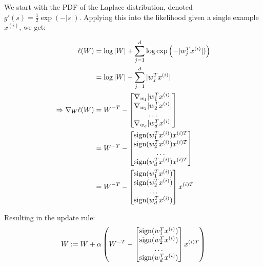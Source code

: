 \begin{answer}
\def\xsi{x^{(i)}}
We start with the PDF of the Laplace distribution, denoted  $g'(s) = \frac{1}{2}\exp(-|s|)$. Applying this into the likelihood given a single example $\xsi$, we get:

\begin{align*}
    \ell(W) &= \log|W| + \sum_{j=1}^\di \log \exp\left(-|w_j^T\xsi|)\right) \\
    &= \log|W| -\sum_{j=1}^\di |w_j^T\xsi| \\
    \Rightarrow \nabla_W\ell(W) &= W^{-T} - \begin{bmatrix} \nabla_{w_1}|w_1^T\xsi| \\ \nabla_{w_2}|w_2^T\xsi| \\
    \ldots \\
    \nabla_{w_{\di}}|w_{\di}^T\xsi|
    \end{bmatrix} \\
    &=  W^{-T} - \begin{bmatrix} \text{sign}(w_1^T\xsi)x^{(i)T} \\
    \text{sign}(w_2^T\xsi)x^{(i)T} \\
    \ldots\\
    \text{sign}(w_{\di}^T\xsi)x^{(i)T}
    \end{bmatrix} \\
    &= W^{-T} - \begin{bmatrix} \text{sign}(w_1^T\xsi) \\
    \text{sign}(w_2^T\xsi) \\
    \ldots\\
    \text{sign}(w_{\di}^T\xsi)
    \end{bmatrix}x^{(i)T}
\end{align*}

Resulting in the update rule:
\begin{align*}
    W := W + \alpha \left(W^{-T} - \begin{bmatrix} \text{sign}(w_1^T\xsi) \\
    \text{sign}(w_2^T\xsi) \\
    \ldots\\
    \text{sign}(w_{\di}^T\xsi)
    \end{bmatrix}x^{(i)T} \right)
\end{align*}
\end{answer}
